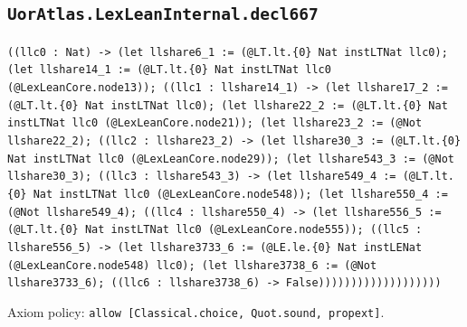 \documentclass[11pt]{article}
\begin{document}
\subsection*{\texttt{UorAtlas.LexLeanInternal.decl667}}
\noindent\texttt{((llc0 : Nat) -> (let llshare6\_1 := (@LT.lt.\{0\} Nat instLTNat llc0); (let llshare14\_1 := (@LT.lt.\{0\} Nat instLTNat llc0 (@LexLeanCore.node13)); ((llc1 : llshare14\_1) -> (let llshare17\_2 := (@LT.lt.\{0\} Nat instLTNat llc0); (let llshare22\_2 := (@LT.lt.\{0\} Nat instLTNat llc0 (@LexLeanCore.node21)); (let llshare23\_2 := (@Not llshare22\_2); ((llc2 : llshare23\_2) -> (let llshare30\_3 := (@LT.lt.\{0\} Nat instLTNat llc0 (@LexLeanCore.node29)); (let llshare543\_3 := (@Not llshare30\_3); ((llc3 : llshare543\_3) -> (let llshare549\_4 := (@LT.lt.\{0\} Nat instLTNat llc0 (@LexLeanCore.node548)); (let llshare550\_4 := (@Not llshare549\_4); ((llc4 : llshare550\_4) -> (let llshare556\_5 := (@LT.lt.\{0\} Nat instLTNat llc0 (@LexLeanCore.node555)); ((llc5 : llshare556\_5) -> (let llshare3733\_6 := (@LE.le.\{0\} Nat instLENat (@LexLeanCore.node548) llc0); (let llshare3738\_6 := (@Not llshare3733\_6); ((llc6 : llshare3738\_6) -> False)))))))))))))))))))}\par
\noindent Axiom policy: \texttt{allow [Classical.choice, Quot.sound, propext]}.\par
\end{document}
